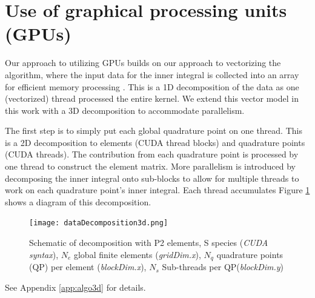 \documentclass[12pt]{siamart}
\begin{document}
\section{Use of graphical processing units (GPUs)}

Our approach to utilizing GPUs builds on our approach to vectorizing the algorithm, where the input data for the inner integral is collected into an array for efficient memory processing \cite{AdamsHirvijokiKnepleyBrownIsaacMills2017}.
This is a 1D decomposition of the data as one (vectorized) thread processed the entire kernel.
We extend this vector model in this work with a 3D decomposition to accommodate parallelism.

The first step is to simply put each global quadrature point on one thread.
This is a 2D decomposition to elements (CUDA thread blocks) and quadrature points (CUDA threads).
The contribution from each quadrature point is processed by one thread to construct the element matrix.
More parallelism is introduced by decomposing the inner integral onto sub-blocks to allow for multiple threads to work on each quadrature point's inner integral.
Each thread accumulates 
Figure \ref{fig:3d} shows a diagram of this decomposition.
\begin{figure}[htbp]
\begin{center}
\texttt{[image: dataDecomposition3d.png]}
\caption{Schematic of decomposition with P2 elements, S species ({\emph{CUDA syntax}}), $N_e$ global finite elements (\emph{gridDim.x}), $N_q$ quadrature points (QP) per element (\emph{blockDim.x}), $N_s$ Sub-threads per QP(\emph{blockDim.y})
}
\label{fig:3d}
\end{center}
\end{figure}
See Appendix \ref{app:algo3d} for details.
\end{document}
